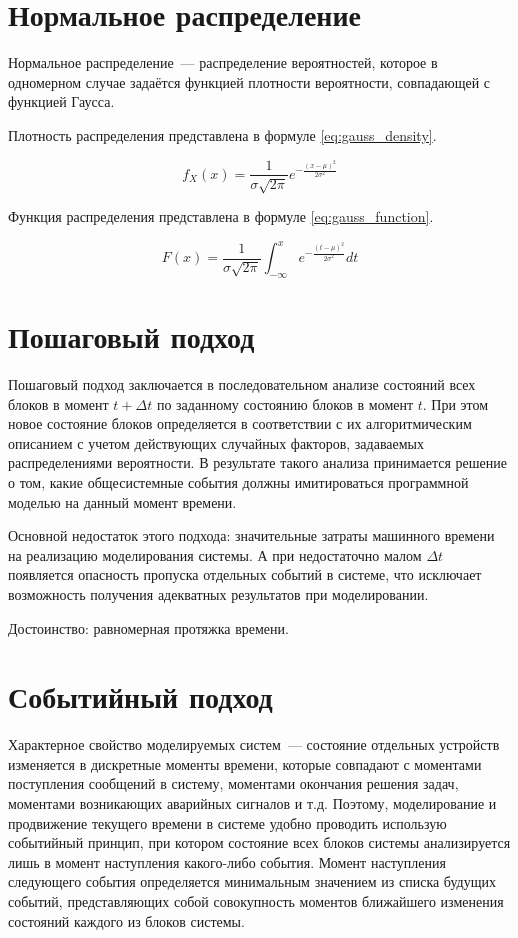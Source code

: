 \section{Нормальное распределение}

Нормальное распределение~--- распределение вероятностей, которое в одномерном случае задаётся функцией плотности вероятности, совпадающей с функцией Гаусса.

Плотность распределения представлена в формуле \ref{eq:gauss_density}.

\begin{equation}\label{eq:gauss_density}
    f_X (x) = \frac{1}{\sigma \sqrt{2 \pi}} e^{-\frac{(x - \mu)^2}{2 \sigma^2}}
\end{equation}

Функция распределения представлена в формуле \ref{eq:gauss_function}.

\begin{equation}\label{eq:gauss_function}
    F (x) = \frac{1}{\sigma \sqrt{2\pi}} \int_{-\infty}^x e^{-\frac{(t- \mu)^2}{2 \sigma^2}} dt
\end{equation}

\section{Пошаговый подход}
Пошаговый подход заключается в последовательном анализе состояний всех блоков в момент $t + \Delta t$ по заданному состоянию блоков в момент $t$. При этом новое состояние блоков определяется в соответствии с их алгоритмическим описанием с учетом действующих случайных факторов, задаваемых распределениями вероятности. В результате такого анализа принимается решение о том, какие общесистемные события должны имитироваться программной моделью на данный момент времени.

Основной недостаток этого подхода: значительные затраты машинного времени на реализацию моделирования системы. А при недостаточно малом $\Delta t$ появляется опасность пропуска отдельных событий в системе, что исключает возможность получения адекватных результатов при моделировании.

Достоинство: равномерная протяжка времени.

\section{Событийный подход}
Характерное свойство моделируемых систем~--- состояние отдельных устройств изменяется в дискретные моменты времени, которые совпадают с моментами поступления сообщений в систему, моментами окончания решения задач, моментами возникающих аварийных сигналов и т.д. Поэтому, моделирование и продвижение текущего времени в системе удобно проводить использую событийный принцип, при котором состояние всех блоков системы анализируется лишь в момент наступления какого-либо события. Момент наступления следующего события определяется минимальным значением из списка будущих событий, представляющих собой совокупность моментов ближайшего изменения состояний каждого из блоков системы.

